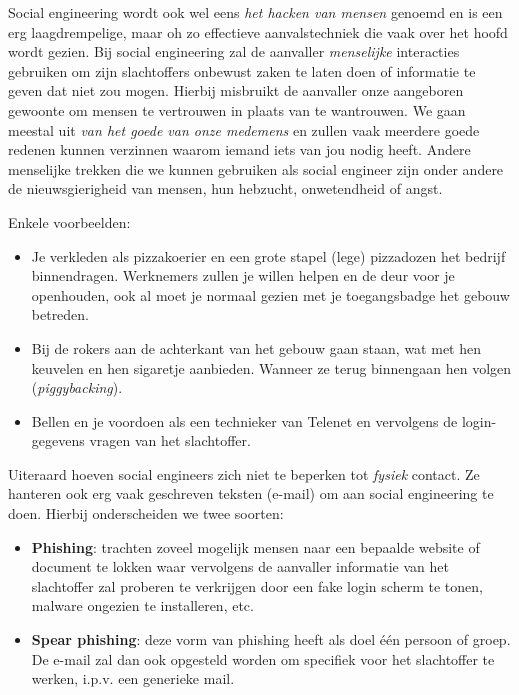 \documentclass[
  10pt,
  dutch,
  paper=a4,
  ,captions=tableheading
]{scrbook}
\providecommand{\tightlist}{%
  \setlength{\itemsep}{0pt}\setlength{\parskip}{0pt}}
\begin{document}
Social engineering wordt ook wel eens \emph{het hacken van mensen}
genoemd en is een erg laagdrempelige, maar oh zo effectieve
aanvalstechniek die vaak over het hoofd wordt gezien. Bij social
engineering zal de aanvaller \emph{menselijke} interacties gebruiken om
zijn slachtoffers onbewust zaken te laten doen of informatie te geven
dat niet zou mogen. Hierbij misbruikt de aanvaller onze aangeboren
gewoonte om mensen te vertrouwen in plaats van te wantrouwen. We gaan
meestal uit \emph{van het goede van onze medemens} en zullen vaak
meerdere goede redenen kunnen verzinnen waarom iemand iets van jou nodig
heeft. Andere menselijke trekken die we kunnen gebruiken als social
engineer zijn onder andere de nieuwsgierigheid van mensen, hun hebzucht,
onwetendheid of angst.

Enkele voorbeelden:

\begin{itemize}
\tightlist
\item
  Je verkleden als pizzakoerier en een grote stapel (lege) pizzadozen
  het bedrijf binnendragen. Werknemers zullen je willen helpen en de
  deur voor je openhouden, ook al moet je normaal gezien met je
  toegangsbadge het gebouw betreden.
\item
  Bij de rokers aan de achterkant van het gebouw gaan staan, wat met hen
  keuvelen en hen sigaretje aanbieden. Wanneer ze terug binnengaan hen
  volgen (\emph{piggybacking}).
\item
  Bellen en je voordoen als een technieker van Telenet en vervolgens de
  login-gegevens vragen van het slachtoffer.
\end{itemize}

Uiteraard hoeven social engineers zich niet te beperken tot
\emph{fysiek} contact. Ze hanteren ook erg vaak geschreven teksten
(e-mail) om aan social engineering te doen. Hierbij onderscheiden we
twee soorten:

\begin{itemize}
\tightlist
\item
  \textbf{Phishing}: trachten zoveel mogelijk mensen naar een bepaalde
  website of document te lokken waar vervolgens de aanvaller informatie
  van het slachtoffer zal proberen te verkrijgen door een fake login
  scherm te tonen, malware ongezien te installeren, etc.
\item
  \textbf{Spear phishing}: deze vorm van phishing heeft als doel één
  persoon of groep. De e-mail zal dan ook opgesteld worden om specifiek
  voor het slachtoffer te werken, i.p.v. een generieke mail.
\end{itemize}
\end{document}
